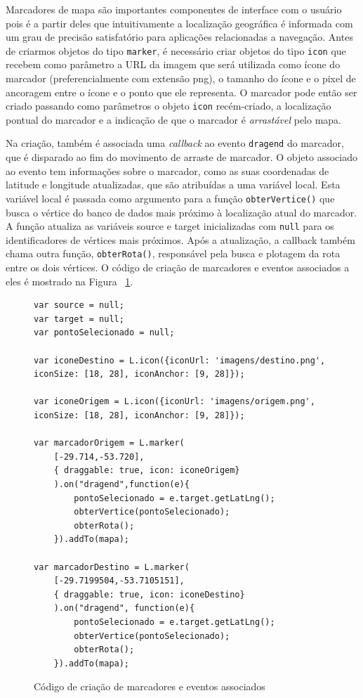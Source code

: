 \documentclass[oneside,openright,12pt]{ufsm_2015} %
\begin{document}
    
    
Marcadores de mapa são importantes componentes de interface com o usuário pois é a partir deles que intuitivamente a localização geográfica é informada com um grau de precisão satisfatório para aplicações relacionadas a navegação. 
Antes de criarmos objetos do tipo {\tt marker}, é necessário criar objetos do tipo {\tt icon} que recebem como parâmetro a URL da imagem que será utilizada como ícone do marcador (preferencialmente com extensão png), o tamanho do ícone e o pixel de ancoragem entre o ícone e o ponto que ele representa. 
O marcador pode então ser criado passando como parâmetros o objeto {\tt icon} recém-criado, a localização pontual do marcador e a indicação de que o marcador é \textit{arrastável} pelo mapa.

Na criação, também é associada uma \textit{callback} ao evento {\tt dragend} do marcador, que é disparado ao fim do movimento de arraste de marcador. O objeto associado ao evento tem informações sobre o marcador, como as suas coordenadas de latitude e longitude atualizadas, que são atribuídas a uma variável local. Esta variável local é passada como argumento para a função {\tt obterVertice()} que busca o vértice do banco de dados mais próximo à localização atual do marcador. A função atualiza as variáveis source e target inicializadas com {\tt null} para os identificadores de vértices mais próximos. Após a atualização, a callback também chama outra função, {\tt obterRota()}, responsável pela busca e plotagem da rota entre os dois vértices. O código de criação de marcadores e eventos associados a eles é mostrado na Figura~ \ref{codigo:marcadores}.


\begin{figure}
    \centering

    \caption{Código de criação de marcadores e eventos associados}
    \label{codigo:marcadores}

\begin{lstlisting}[]
var source = null;
var target = null;
var pontoSelecionado = null;

var iconeDestino = L.icon({iconUrl: 'imagens/destino.png', iconSize: [18, 28], iconAnchor: [9, 28]});

var iconeOrigem = L.icon({iconUrl: 'imagens/origem.png', iconSize: [18, 28], iconAnchor: [9, 28]});

var marcadorOrigem = L.marker(
    [-29.714,-53.720],
    { draggable: true, icon: iconeOrigem}
    ).on("dragend",function(e){
        pontoSelecionado = e.target.getLatLng();
        obterVertice(pontoSelecionado);
        obterRota();
    }).addTo(mapa);

var marcadorDestino = L.marker(
    [-29.7199504,-53.7105151],
    { draggable: true, icon: iconeDestino}
    ).on("dragend", function(e){
        pontoSelecionado = e.target.getLatLng();
        obterVertice(pontoSelecionado);
        obterRota();
    }).addTo(mapa);
\end{lstlisting}
    
\end{figure}
\end{document}
